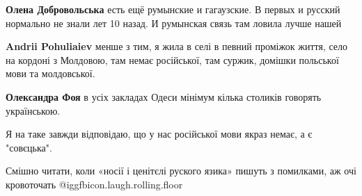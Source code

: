 \begin{itemize}
\begin{itemize}
 
\textbf{Олена Добровольська} есть ещё румынские и гагаузские. В первых и русский нормально не знали лет 10 назад. И румынская связь там ловила лучше нашей

 
\textbf{Andrii Pohuliaiev} менше з тим, я жила в селі в певний проміжок життя, село на кордоні з Молдовою, там немає російської, там суржик, домішки польської мови та молдовської.

 
\textbf{Олександра Фоя} в усіх закладах Одеси мінімум кілька столиків говорять українською.
\end{itemize}

 
Я на таке завжди відповідаю, що у нас російської мови якраз немає, а є "совєцька".

 
Смішно читати, коли «носії і ценітєлі руского язика» пишуть з помилками, аж очі кровоточать  @igg{fbicon.laugh.rolling.floor} 

\begin{itemize}
 

\end{itemize}
\end{itemize}
